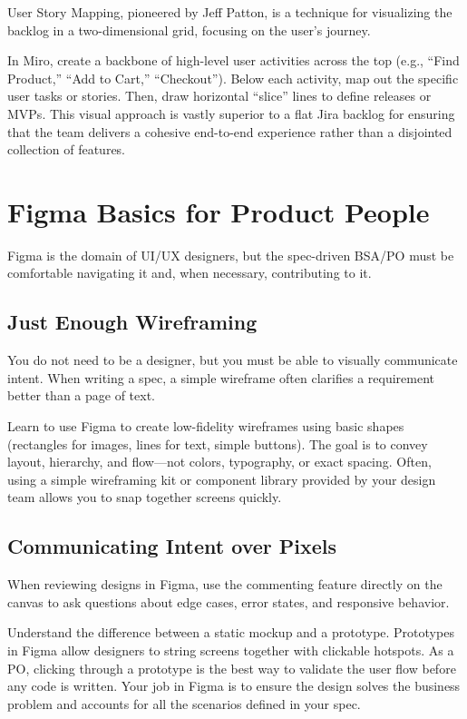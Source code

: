 User Story Mapping, pioneered by Jeff Patton, is a technique for
visualizing the backlog in a two-dimensional grid, focusing on the
user's journey.

In Miro, create a backbone of high-level user activities across the top
(e.g., ``Find Product,'' ``Add to Cart,'' ``Checkout''). Below each
activity, map out the specific user tasks or stories. Then, draw
horizontal ``slice'' lines to define releases or MVPs. This visual
approach is vastly superior to a flat Jira backlog for ensuring that the
team delivers a cohesive end-to-end experience rather than a disjointed
collection of features.

\section{Figma Basics for Product
People}\label{figma-basics-for-product-people}

Figma is the domain of UI/UX designers, but the spec-driven BSA/PO must
be comfortable navigating it and, when necessary, contributing to it.

\subsection{Just Enough Wireframing}\label{just-enough-wireframing}

You do not need to be a designer, but you must be able to visually
communicate intent. When writing a spec, a simple wireframe often
clarifies a requirement better than a page of text.

Learn to use Figma to create low-fidelity wireframes using basic shapes
(rectangles for images, lines for text, simple buttons). The goal is to
convey layout, hierarchy, and flow---not colors, typography, or exact
spacing. Often, using a simple wireframing kit or component library
provided by your design team allows you to snap together screens
quickly.

\subsection{Communicating Intent over
Pixels}\label{communicating-intent-over-pixels}

When reviewing designs in Figma, use the commenting feature directly on
the canvas to ask questions about edge cases, error states, and
responsive behavior.

Understand the difference between a static mockup and a prototype.
Prototypes in Figma allow designers to string screens together with
clickable hotspots. As a PO, clicking through a prototype is the best
way to validate the user flow before any code is written. Your job in
Figma is to ensure the design solves the business problem and accounts
for all the scenarios defined in your spec.

